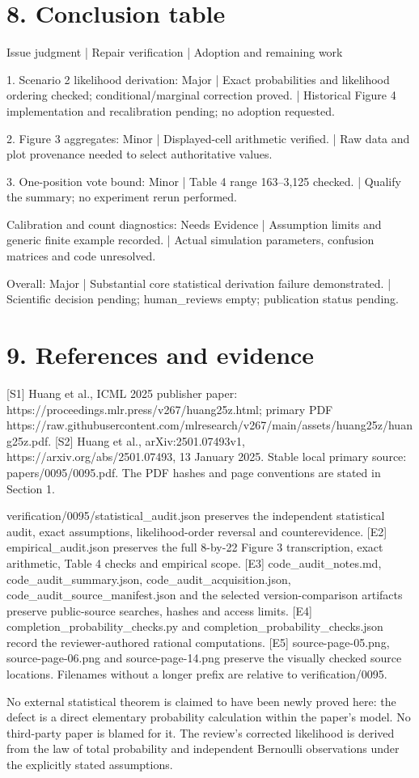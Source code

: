 \documentclass[10pt]{article}
\begin{document}
\section*{8. Conclusion table}
Issue judgment | Repair verification | Adoption and remaining work\par
1. Scenario 2 likelihood derivation: Major | Exact probabilities and likelihood ordering checked; conditional/marginal correction proved. | Historical Figure 4 implementation and recalibration pending; no adoption requested.\par
2. Figure 3 aggregates: Minor | Displayed-cell arithmetic verified. | Raw data and plot provenance needed to select authoritative values.\par
3. One-position vote bound: Minor | Table 4 range 163–3,125 checked. | Qualify the summary; no experiment rerun performed.\par
Calibration and count diagnostics: Needs Evidence | Assumption limits and generic finite example recorded. | Actual simulation parameters, confusion matrices and code unresolved.\par
Overall: Major | Substantial core statistical derivation failure demonstrated. | Scientific decision pending; human\_reviews empty; publication status pending.\par
\section*{9. References and evidence}
[S1] Huang et al., ICML 2025 publisher paper: https://proceedings.mlr.press/v267/huang25z.html; primary PDF https://raw.githubusercontent.com/mlresearch/v267/main/assets/huang25z/huang25z.pdf. [S2] Huang et al., arXiv:2501.07493v1, https://arxiv.org/abs/2501.07493, 13 January 2025. Stable local primary source: papers/0095/0095.pdf. The PDF hashes and page conventions are stated in Section 1.\par
[E1] verification/0095/statistical\_audit.json preserves the independent statistical audit, exact assumptions, likelihood-order reversal and counterevidence. [E2] empirical\_audit.json preserves the full 8-by-22 Figure 3 transcription, exact arithmetic, Table 4 checks and empirical scope. [E3] code\_audit\_notes.md, code\_audit\_summary.json, code\_audit\_acquisition.json, code\_audit\_source\_manifest.json and the selected version-comparison artifacts preserve public-source searches, hashes and access limits. [E4] completion\_probability\_checks.py and completion\_probability\_checks.json record the reviewer-authored rational computations. [E5] source-page-05.png, source-page-06.png and source-page-14.png preserve the visually checked source locations. Filenames without a longer prefix are relative to verification/0095.\par
No external statistical theorem is claimed to have been newly proved here: the defect is a direct elementary probability calculation within the paper’s model. No third-party paper is blamed for it. The review’s corrected likelihood is derived from the law of total probability and independent Bernoulli observations under the explicitly stated assumptions.\par
\end{document}
